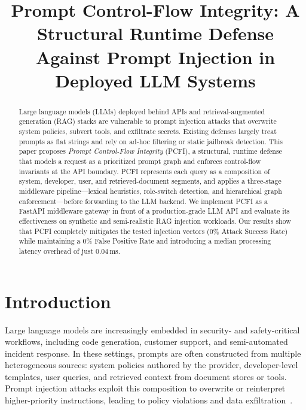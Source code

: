 \documentclass[conference]{IEEEtran}
\begin{document}
\title{Prompt Control-Flow Integrity: A Structural Runtime Defense Against Prompt Injection in Deployed LLM Systems}

\author{
}

\maketitle

\begin{abstract}
Large language models (LLMs) deployed behind APIs and retrieval-augmented generation (RAG) stacks are vulnerable to prompt injection attacks that overwrite system policies, subvert tools, and exfiltrate secrets. Existing defenses largely treat prompts as flat strings and rely on ad-hoc filtering or static jailbreak detection. This paper proposes \emph{Prompt Control-Flow Integrity} (PCFI), a structural, runtime defense that models a request as a prioritized prompt graph and enforces control-flow invariants at the API boundary. PCFI represents each query as a composition of system, developer, user, and retrieved-document segments, and applies a three-stage middleware pipeline---lexical heuristics, role-switch detection, and hierarchical graph enforcement---before forwarding to the LLM backend. We implement PCFI as a FastAPI middleware gateway in front of a production-grade LLM API and evaluate its effectiveness on synthetic and semi-realistic RAG injection workloads. Our results show that PCFI completely mitigates the tested injection vectors (0\% Attack Success Rate) while maintaining a 0\% False Positive Rate and introducing a median processing latency overhead of just 0.04\,ms.
\end{abstract}

\section{Introduction}

Large language models are increasingly embedded in security- and safety-critical workflows, including code generation, customer support, and semi-automated incident response. In these settings, prompts are often constructed from multiple heterogeneous sources: system policies authored by the provider, developer-level templates, user queries, and retrieved context from document stores or tools. Prompt injection attacks exploit this composition to overwrite or reinterpret higher-priority instructions, leading to policy violations and data exfiltration~\cite{sok_prompt_hacking,rag_n_roll}.
\end{document}
